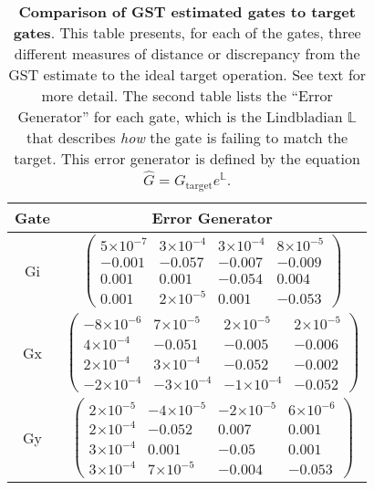 \documentclass{article}[11pt]
\providecommand{\e}[1]{\ensuremath{\times 10^{#1}}}
\begin{document}
\begin{table}[h]
\begin{center}
\vspace{2em}
\begin{tabular}[l]{|c|c|}
\hline
Gate & Error Generator \\ \hline
Gi & $ \left(\!\!\begin{array}{cccc}
5\e{-7} & 3\e{-4} & 3\e{-4} & 8\e{-5} \\ 
-0.001 & -0.057 & -0.007 & -0.009 \\ 
0.001 & 0.001 & -0.054 & 0.004 \\ 
0.001 & 2\e{-5} & 0.001 & -0.053
 \end{array}\!\!\right) $
 \\ \hline
Gx & $ \left(\!\!\begin{array}{cccc}
-8\e{-6} & 7\e{-5} & 2\e{-5} & 2\e{-5} \\ 
4\e{-4} & -0.051 & -0.005 & -0.006 \\ 
2\e{-4} & 3\e{-4} & -0.052 & -0.002 \\ 
-2\e{-4} & -3\e{-4} & -1\e{-4} & -0.052
 \end{array}\!\!\right) $
 \\ \hline
Gy & $ \left(\!\!\begin{array}{cccc}
2\e{-5} & -4\e{-5} & -2\e{-5} & 6\e{-6} \\ 
2\e{-4} & -0.052 & 0.007 & 0.001 \\ 
3\e{-4} & 0.001 & -0.05 & 0.001 \\ 
3\e{-4} & 7\e{-5} & -0.004 & -0.053
 \end{array}\!\!\right) $
 \\ \hline
\end{tabular}

\caption{\textbf{Comparison of GST estimated gates to target gates}.  This table presents, for each of the gates, three different measures of distance or discrepancy from the GST estimate to the ideal target operation.  See text for more detail.  The second table lists the ``Error Generator'' for each gate, which is the Lindbladian $\mathbb{L}$ that describes \emph{how} the gate is failing to match the target.  This error generator is defined by the equation $\hat{G} = G_{\mathrm{target}}e^{\mathbb{L}}$. \label{bestGatesetVsTargetTable}}
\end{center}
\end{table}
\end{document}
